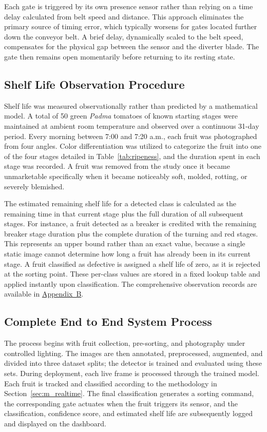 Each gate is triggered by its own presence sensor rather than relying on a time delay calculated from belt speed and distance. This approach eliminates the primary source of timing error, which typically worsens for gates located further down the conveyor belt. A brief delay, dynamically scaled to the belt speed, compensates for the physical gap between the sensor and the diverter blade. The gate then remains open momentarily before returning to its resting state.

\subsection{Shelf Life Observation Procedure}
\label{sec:m_shelflife}

Shelf life was measured observationally rather than predicted by a mathematical model. A total of 50 green \textit{Padma} tomatoes of known starting stages were maintained at ambient room temperature and observed over a continuous 31-day period. Every morning between 7:00 and 7:20 a.m., each fruit was photographed from four angles. Color differentiation was utilized to categorize the fruit into one of the four stages detailed in Table~\ref{tab:ripeness}, and the duration spent in each stage was recorded. A fruit was removed from the study once it became unmarketable specifically when it became noticeably soft, molded, rotting, or severely blemished.

The estimated remaining shelf life for a detected class is calculated as the remaining time in that current stage plus the full duration of all subsequent stages. For instance, a fruit detected as a breaker is credited with the remaining breaker stage duration plus the complete duration of the turning and red stages. This represents an upper bound rather than an exact value, because a single static image cannot determine how long a fruit has already been in its current stage. A fruit classified as defective is assigned a shelf life of zero, as it is rejected at the sorting point. These per-class values are stored in a fixed lookup table and applied instantly upon classification. The comprehensive observation records are available in \hyperref[app:B]{Appendix~B}.

\subsection{Complete End to End System Process}
\label{sec:m_endtoend}

The process begins with fruit collection, pre-sorting, and photography under controlled lighting. The images are then annotated, preprocessed, augmented, and divided into three dataset splits; the detector is trained and evaluated using these sets. During deployment, each live frame is processed through the trained model. Each fruit is tracked and classified according to the methodology in Section~\ref{sec:m_realtime}. The final classification generates a sorting command, the corresponding gate actuates when the fruit triggers its sensor, and the classification, confidence score, and estimated shelf life are subsequently logged and displayed on the dashboard.

